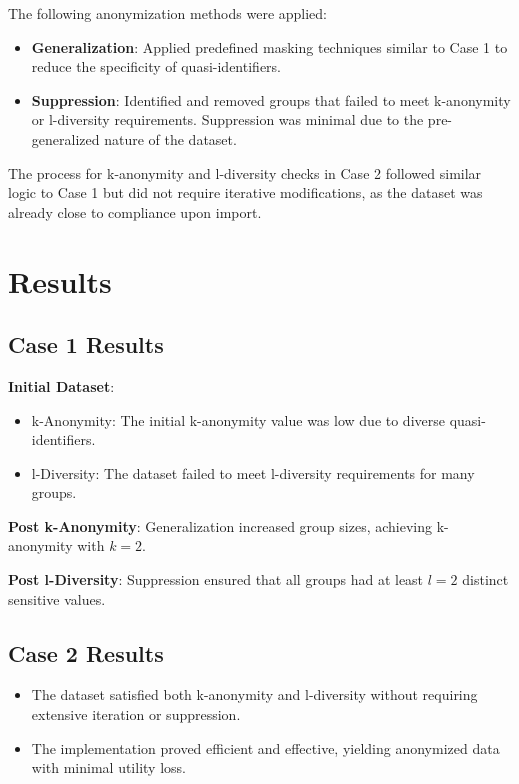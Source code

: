 \documentclass[conference]{IEEEtran}
\begin{document}
	The following anonymization methods were applied:
	\begin{itemize}
		\item \textbf{Generalization}: Applied predefined masking techniques similar to Case 1 to reduce the specificity of quasi-identifiers.
		\item \textbf{Suppression}: Identified and removed groups that failed to meet k-anonymity or l-diversity requirements. Suppression was minimal due to the pre-generalized nature of the dataset.
	\end{itemize}
	
	The process for k-anonymity and l-diversity checks in Case 2 followed similar logic to Case 1 but did not require iterative modifications, as the dataset was already close to compliance upon import.
	
	\section{Results}
	
	\subsection{Case 1 Results}
	\textbf{Initial Dataset}:
	\begin{itemize}
		\item k-Anonymity: The initial k-anonymity value was low due to diverse quasi-identifiers.
		\item l-Diversity: The dataset failed to meet l-diversity requirements for many groups.
	\end{itemize}
	
	\textbf{Post k-Anonymity}: Generalization increased group sizes, achieving k-anonymity with $k=2$.
	
	\textbf{Post l-Diversity}: Suppression ensured that all groups had at least $l=2$ distinct sensitive values.
	
	\subsection{Case 2 Results}
	\begin{itemize}
		\item The dataset satisfied both k-anonymity and l-diversity without requiring extensive iteration or suppression.
		\item The implementation proved efficient and effective, yielding anonymized data with minimal utility loss.
	\end{itemize}
	
\end{document}
